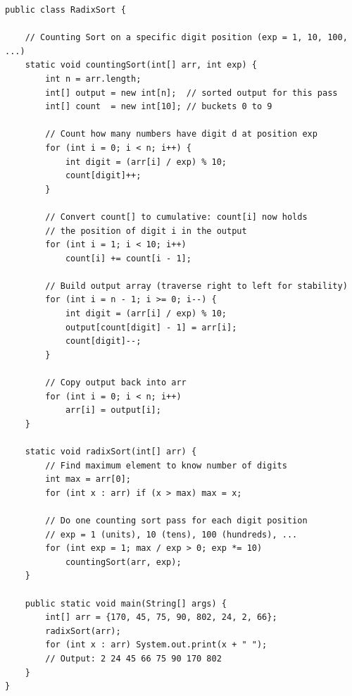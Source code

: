 \documentclass[12pt,a4paper,oneside]{book}
\begin{document}
\begin{lstlisting}[caption={Radix Sort --- O(d*n) time, O(n+b) space, stable}]
public class RadixSort {

    // Counting Sort on a specific digit position (exp = 1, 10, 100, ...)
    static void countingSort(int[] arr, int exp) {
        int n = arr.length;
        int[] output = new int[n];  // sorted output for this pass
        int[] count  = new int[10]; // buckets 0 to 9

        // Count how many numbers have digit d at position exp
        for (int i = 0; i < n; i++) {
            int digit = (arr[i] / exp) % 10;
            count[digit]++;
        }

        // Convert count[] to cumulative: count[i] now holds
        // the position of digit i in the output
        for (int i = 1; i < 10; i++)
            count[i] += count[i - 1];

        // Build output array (traverse right to left for stability)
        for (int i = n - 1; i >= 0; i--) {
            int digit = (arr[i] / exp) % 10;
            output[count[digit] - 1] = arr[i];
            count[digit]--;
        }

        // Copy output back into arr
        for (int i = 0; i < n; i++)
            arr[i] = output[i];
    }

    static void radixSort(int[] arr) {
        // Find maximum element to know number of digits
        int max = arr[0];
        for (int x : arr) if (x > max) max = x;

        // Do one counting sort pass for each digit position
        // exp = 1 (units), 10 (tens), 100 (hundreds), ...
        for (int exp = 1; max / exp > 0; exp *= 10)
            countingSort(arr, exp);
    }

    public static void main(String[] args) {
        int[] arr = {170, 45, 75, 90, 802, 24, 2, 66};
        radixSort(arr);
        for (int x : arr) System.out.print(x + " ");
        // Output: 2 24 45 66 75 90 170 802
    }
}
\end{lstlisting}
\end{document}
